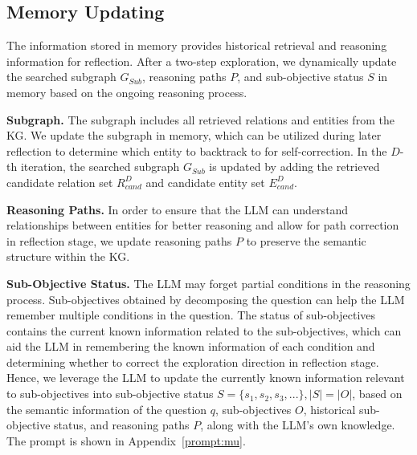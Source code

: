 \documentclass{article}
\begin{document}
\subsection{Memory Updating}
\vspace{-2mm}
The information stored in memory provides historical retrieval and reasoning information for reflection. 
After a two-step exploration, we dynamically update the searched subgraph $G_{Sub}$, reasoning paths $P$, and sub-objective status $S$ in memory based on the ongoing reasoning process.

\textbf{Subgraph.} 
The subgraph includes all retrieved relations and entities from the KG.
We update the subgraph in memory, which can be utilized during later reflection to determine which entity to backtrack to for self-correction.
In the $D$-th iteration, the searched subgraph $G_{Sub}$ is updated by adding the retrieved candidate relation set $R_{cand}^D$ and candidate entity set $E_{cand}^D$.

\textbf{Reasoning Paths.} 
In order to ensure that the LLM can understand relationships between entities for better reasoning and allow for path correction in reflection stage, we update reasoning paths $P$ to preserve the semantic structure within the KG.

\textbf{Sub-Objective Status.}
The LLM may forget partial conditions in the reasoning process. Sub-objectives obtained by decomposing the question can help the LLM remember multiple conditions in the question. 
The status of sub-objectives contains the current known information related to the sub-objectives,
which can aid the LLM in remembering the known information of each condition and determining whether to correct the exploration direction in reflection stage.
Hence, we leverage the LLM to update the currently known information relevant to sub-objectives into sub-objective status $S = \{s_1, s_2, s_3, ...\},  |S| = |O|$, based on the semantic information of the question $q$, sub-objectives $O$, historical sub-objective status, and reasoning paths $P$, along with the LLM's own knowledge. 
The prompt is shown in Appendix~\ref{prompt:mu}.
\end{document}
